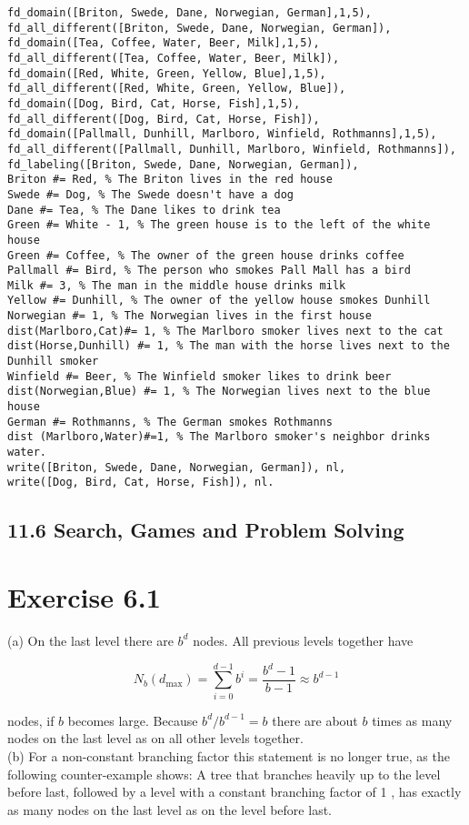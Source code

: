 \documentclass[10pt]{article}
\begin{document}
\begin{verbatim}
fd_domain([Briton, Swede, Dane, Norwegian, German],1,5),
fd_all_different([Briton, Swede, Dane, Norwegian, German]),
fd_domain([Tea, Coffee, Water, Beer, Milk],1,5),
fd_all_different([Tea, Coffee, Water, Beer, Milk]),
fd_domain([Red, White, Green, Yellow, Blue],1,5),
fd_all_different([Red, White, Green, Yellow, Blue]),
fd_domain([Dog, Bird, Cat, Horse, Fish],1,5),
fd_all_different([Dog, Bird, Cat, Horse, Fish]),
fd_domain([Pallmall, Dunhill, Marlboro, Winfield, Rothmanns],1,5),
fd_all_different([Pallmall, Dunhill, Marlboro, Winfield, Rothmanns]),
fd_labeling([Briton, Swede, Dane, Norwegian, German]),
Briton #= Red, % The Briton lives in the red house
Swede #= Dog, % The Swede doesn't have a dog
Dane #= Tea, % The Dane likes to drink tea
Green #= White - 1, % The green house is to the left of the white house
Green #= Coffee, % The owner of the green house drinks coffee
Pallmall #= Bird, % The person who smokes Pall Mall has a bird
Milk #= 3, % The man in the middle house drinks milk
Yellow #= Dunhill, % The owner of the yellow house smokes Dunhill
Norwegian #= 1, % The Norwegian lives in the first house
dist(Marlboro,Cat)#= 1, % The Marlboro smoker lives next to the cat
dist(Horse,Dunhill) #= 1, % The man with the horse lives next to the Dunhill smoker
Winfield #= Beer, % The Winfield smoker likes to drink beer
dist(Norwegian,Blue) #= 1, % The Norwegian lives next to the blue house
German #= Rothmanns, % The German smokes Rothmanns
dist (Marlboro,Water)#=1, % The Marlboro smoker's neighbor drinks water.
write([Briton, Swede, Dane, Norwegian, German]), nl,
write([Dog, Bird, Cat, Horse, Fish]), nl.
\end{verbatim}

\subsection*{11.6 Search, Games and Problem Solving}
\section*{Exercise 6.1}
(a) On the last level there are $b^{d}$ nodes. All previous levels together have

$$
N_{b}\left(d_{\max }\right)=\sum_{i=0}^{d-1} b^{i}=\frac{b^{d}-1}{b-1} \approx b^{d-1}
$$

nodes, if $b$ becomes large. Because $b^{d} / b^{d-1}=b$ there are about $b$ times as many nodes on the last level as on all other levels together.\\
(b) For a non-constant branching factor this statement is no longer true, as the following counter-example shows: A tree that branches heavily up to the level before last, followed by a level with a constant branching factor of 1 , has exactly as many nodes on the last level as on the level before last.
\end{document}
